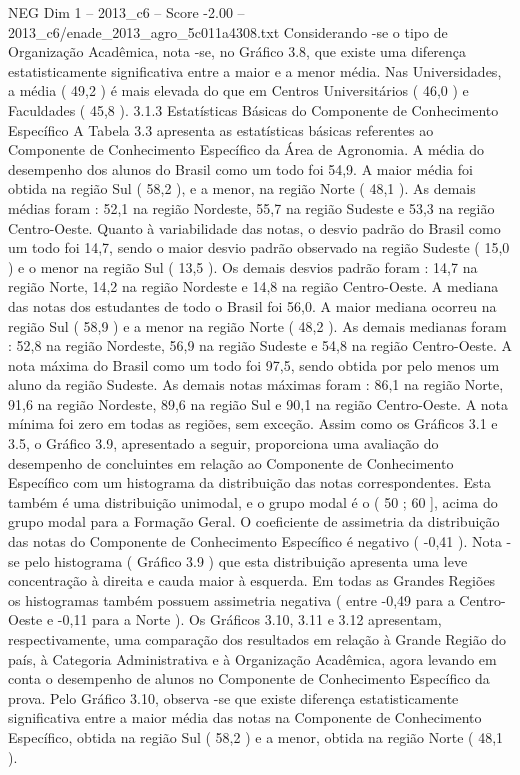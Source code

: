 \begin{textsample}{NEG Dim 1 – 2013\_c6 – Score -2.00 – 2013\_c6/enade\_2013\_agro\_5c011a4308.txt}
Considerando -se o tipo de Organização Acadêmica, nota -se, no Gráfico 3.8, que existe uma diferença estatisticamente significativa entre a maior e a menor média.
Nas Universidades, a média ( 49,2 ) é mais elevada do que em Centros Universitários ( 46,0 ) e Faculdades ( 45,8 ). 3.1.3 Estatísticas Básicas do Componente de Conhecimento Específico A Tabela 3.3 apresenta as estatísticas básicas referentes ao Componente de Conhecimento Específico da Área de Agronomia.
A média do desempenho dos alunos do Brasil como um todo foi 54,9.
A maior média foi obtida na região Sul ( 58,2 ), e a menor, na região Norte ( 48,1 ).
As demais médias foram : 52,1 na região Nordeste, 55,7 na região Sudeste e 53,3 na região Centro-Oeste.
Quanto à variabilidade das notas, o desvio padrão do Brasil como um todo foi 14,7, sendo o maior desvio padrão observado na região Sudeste ( 15,0 ) e o menor na região Sul ( 13,5 ).
Os demais desvios padrão foram : 14,7 na região Norte, 14,2 na região Nordeste e 14,8 na região Centro-Oeste.
A mediana das notas dos estudantes de todo o Brasil foi 56,0.
A maior mediana ocorreu na região Sul ( 58,9 ) e a menor na região Norte ( 48,2 ).
As demais medianas foram : 52,8 na região Nordeste, 56,9 na região Sudeste e 54,8 na região Centro-Oeste.
A nota máxima do Brasil como um todo foi 97,5, sendo obtida por pelo menos um aluno da região Sudeste.
As demais notas máximas foram : 86,1 na região Norte, 91,6 na região Nordeste, 89,6 na região Sul e 90,1 na região Centro-Oeste.
A nota mínima foi zero em todas as regiões, sem exceção.
Assim como os Gráficos 3.1 e 3.5, o Gráfico 3.9, apresentado a seguir, proporciona uma avaliação do desempenho de concluintes em relação ao Componente de Conhecimento Específico com um histograma da distribuição das notas correspondentes.
Esta também é uma distribuição unimodal, e o grupo modal é o ( 50 ; 60 ], acima do grupo modal para a Formação Geral.
O coeficiente de assimetria da distribuição das notas do Componente de Conhecimento Específico é negativo ( -0,41 ).
Nota -se pelo histograma ( Gráfico 3.9 ) que esta distribuição apresenta uma leve concentração à direita e cauda maior à esquerda.
Em todas as Grandes Regiões os histogramas também possuem assimetria negativa ( entre -0,49 para a Centro-Oeste e -0,11 para a Norte ).
Os Gráficos 3.10, 3.11 e 3.12 apresentam, respectivamente, uma comparação dos resultados em relação à Grande Região do país, à Categoria Administrativa e à Organização Acadêmica, agora levando em conta o desempenho de alunos no Componente de Conhecimento Específico da prova.
Pelo Gráfico 3.10, observa -se que existe diferença estatisticamente significativa entre a maior média das notas na Componente de Conhecimento Específico, obtida na região Sul ( 58,2 ) e a menor, obtida na região Norte ( 48,1 ).

\end{textsample}
